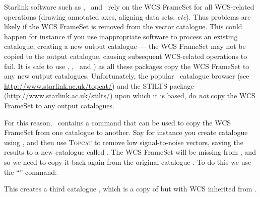 Starlink software such as \polpack, \Kappa\ and \gaia\ rely on the WCS
FrameSet for all WCS-related operations (drawing annotated axes, aligning
data sets, \emph{etc}). Thus problems are likely if the WCS FrameSet is
removed from the vector catalogue. This could happen for instance if you
use inappropriate software to process an existing catalogue, creating a
new output catalogue --- the WCS FrameSet may not be copied to the output
catalogue, causing subsequent WCS-related operations to fail. It is safe
to use \POLPACK, \Kappa, \GAIA\ and ) as
all these packages copy the WCS FrameSet to any new output catalogues.
Unfortunately, the popular \topcat\ catalogue browser (see
\url{http://www.starlink.ac.uk/topcat/}) and the STILTS package
(\url{http://www.starlink.ac.uk/stilts/}) upon which it is based, do
\emph{not} copy the WCS FrameSet to any output catalogues.

For this reason, \POLPACK\ contains a command that can be used to copy the
WCS FrameSet from one catalogue to another.  Say for instance you create
catalogue  using , and then use \textsc{Topcat} to remove
low signal-to-noise vectors, saving the results to a new catalogue called
. The WCS FrameSet will be missing from ,
and so we need to copy it back again from the original catalogue .
To do this we use the ``'' command:

\begin{terminalv}
\end{terminalv}

This creates a third catalogue , which is a copy of
 but with WCS inherited from .







